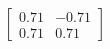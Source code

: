 \documentclass[preview]{standalone}
\begin{document}
\begin{align*}
\begin{bmatrix} 0.71 & -0.71 \\ 0.71 & 0.71 \end{bmatrix}
\end{align*}
\end{document}
